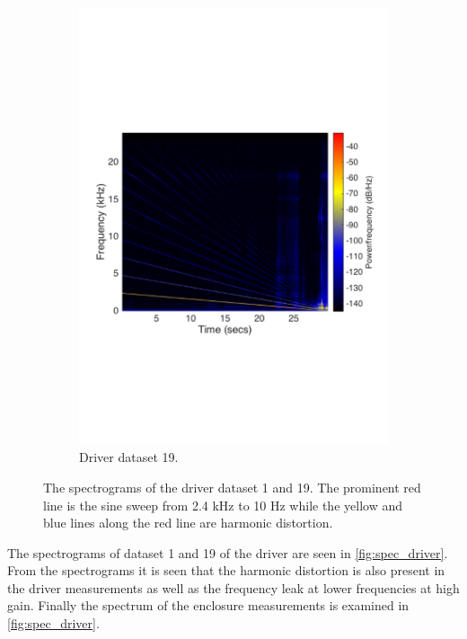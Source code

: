 \begin{figure}[H]
\begin{subfigure}[t]{0.47\textwidth}
	\includegraphics[width=1\textwidth]{figures/spectrogram_driver19.pdf}
	\caption{Driver dataset 19.}
	\label{fig:spectrogram_driver19}
\end{subfigure}
\caption{The spectrograms of the driver dataset 1 and 19. The prominent red line is the sine sweep from 2.4 kHz to 10 Hz while the yellow and blue lines along the red line are harmonic distortion.}
\label{fig:spec_driver}
\end{figure} 

The spectrograms of dataset 1 and 19 of the driver are seen in \autoref{fig:spec_driver}. From the spectrograms it is seen that the harmonic distortion is also present in the driver measurements as well as the frequency leak at lower frequencies at high gain. Finally the spectrum of the enclosure measurements is examined in \autoref{fig:spec_driver}.

